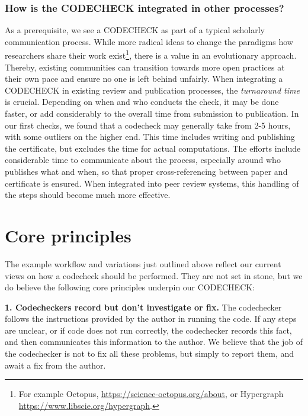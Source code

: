 \documentclass[12pt]{article}
\begin{document}
\subsubsection*{How is the CODECHECK integrated in other processes?}\label{turnaround-time}

As a prerequisite, we see a CODECHECK as part of a typical scholarly
communication process. While more radical ideas to change the paradigms
how researchers share their work exist\footnote{For example Octopus, 
\url{https://science-octopus.org/about}, or Hypergraph
\url{https://www.libscie.org/hypergraph}.},
there is a 
value in an evolutionary approach. Thereby, existing communities can 
transition towards more open practices at their own pace and ensure
no one is left behind unfairly.
When integrating a CODECHECK in existing review and publication processes,
the \emph{turnaround time} is crucial. Depending on when and who conducts
the check, it may be done faster, or add considerably to the overall
time from submission to publication.
In our first checks, we found that a codecheck may generally take from 2-5
hours, with some outliers on the higher end. This time includes writing and
publishing the certificate, but excludes the time for actual computations.
The efforts include considerable time to communicate about the process, 
especially around who publishes what and when, so that proper 
cross-referencing between paper and certificate is ensured.
When integrated into peer review systems, this handling of the steps should
become much more effective.

\section*{Core principles}\label{core-principles}

The example workflow and variations just outlined above reflect our current
views on how a codecheck should be performed. They are not set in
stone, but we do believe the following core principles underpin our
CODECHECK:

\textbf{1. Codecheckers record but don't investigate or fix.} The
codechecker follows the instructions provided by the author in running
the code. If any steps are unclear, or if code does not run correctly,
the codechecker records this fact, and then communicates this
information to the author. We believe that the job of the codechecker is
not to fix all these problems, but simply to report them, and await a
fix from the author.
\end{document}
